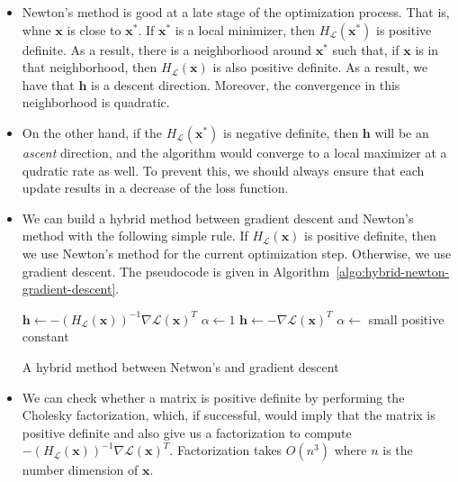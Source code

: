 \documentclass[10pt]{article}
\newcommand{\ve}[1]{\mathbf{#1}}
\newcommand{\mcal}[1]{\mathcal{#1}}
\begin{document}
\begin{itemize}
    \item Newton's method is good at a late stage of the optimization process. That is, whne $\ve{x}$ is close to $\ve{x}^*$. If $\ve{x}^*$ is a local minimizer, then $H_{\mcal{L}}(\ve{x}^*)$ is positive definite. As a result, there is a neighborhood around $\ve{x}^*$ such that, if $\ve{x}$ is in that neighborhood, then $H_{\mcal{L}}(\ve{x})$ is also positive definite. As a result, we have that $\ve{h}$ is a descent direction. Moreover, the convergence in this neighborhood is quadratic.
    
    \item On the other hand, if the $H_{\mcal{L}}(\ve{x}^*)$ is negative definite, then $\ve{h}$ will be an \emph{ascent} direction, and the algorithm would converge to a local maximizer at a qudratic rate as well. To prevent this, we should always ensure that each update results in a decrease of the loss function.
    
    \item We can build a hybrid method between gradient descent and Newton's method with the following simple rule. If $H_{\mcal{L}}(\ve{x})$ is positive definite, then we use Newton's method for the current optimization step. Otherwise, we use gradient descent. The pseudocode is given in Algorithm~\ref{algo:hybrid-newton-gradient-descent}.
    
    \begin{algorithm}[t]
    \begin{algorithmic}
        \If {$H_{\mcal{L}}(\ve{x})$ is postiive definite}
            \State $\ve{h} \gets - (H_{\mcal{L}}(\ve{x}))^{-1} \nabla\mcal{L}(\ve{x})^T$
            \State $\alpha \gets 1$
        \Else
        \State $\ve{h} \gets - \nabla\mcal{L}(\ve{x})^T$
        \State $\alpha \gets $ small positive constant
        \EndIf
    \end{algorithmic}
    \caption{A hybrid method between Netwon's and gradient descent}
    \label{algo:hybrid-newton-gradient-descent}
    \end{algorithm}

    \item We can check whether a matrix is positive definite by performing the Cholesky factorization, which, if successful, would imply that the matrix is positive definite and also give us a factorization to compute $- (H_{\mcal{L}}(\ve{x}))^{-1} \nabla\mcal{L}(\ve{x})^T$. Factorization takes $O(n^3)$ where $n$ is the number dimension of $\ve{x}$.
\end{itemize}
\end{document}
